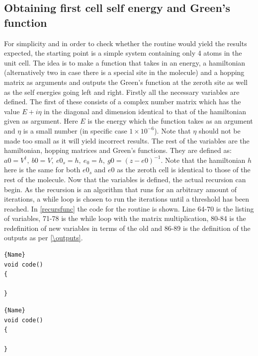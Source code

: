 \subsection{Obtaining first cell self energy and Green's function}\label{recursionroutinesec}
For simplicity and in order to check whether the routine would yield the results expected, the starting point is a simple system containing only 4 atoms in the unit cell. The idea is to make a function that takes in an energy, a hamiltonian (alternatively two in case there is a special site in the molecule) and a hopping matrix as arguments and outputs the Green's function at the zeroth site as well as the self energies going left and right. Firstly all the necessary variables are defined. The first of these consists of a complex number matrix which has the value \(E + i\eta\) in the diagonal and dimension identical to that of the hamiltonian given as argument. Here \(E\) is the energy which the function takes as an argument and \(\eta\) is a small number (in specific case \(1\times10^{-6}\)). Note that \(\eta\) should not be made too small as it will yield incorrect results. The rest of the variables are the hamiltonian, hopping matrices and Green's functions. They are defined as: \(a0 = V^{\dagger}, \ b0 = V, \ e0_{s} = h, \ e_{0} = h, \ g0 = (z-e0)^{-1}\). Note that the hamiltonian \(h\) here is the same for both \(e0_{s}\) and \(e0\) as the zeroth cell is identical to those of the rest of the molecule. Now that the variables is defined, the actual recursion can begin. As the recursion is an algorithm that runs for an arbitrary amount of iterations, a while loop is chosen to run the iterations until a threshold has been reached. In \cref{recursfunc} the code for the routine is shown. Line 64-70 is the listing of variables, 71-78 is the while loop with the matrix multiplication, 80-84 is the redefinition of new variables in terms of the old and 86-89 is the definition of the outputs as per \cref{\outputs}.\\
\noindent\begin{minipage}{.45\textwidth}
\begin{lstlisting}[caption=code 1,frame=tlrb]{Name}
void code()
{

}
\end{lstlisting}
\end{minipage}\hfill
\begin{minipage}{.45\textwidth}
\begin{lstlisting}[caption=code 2,frame=tlrb]{Name}
void code()
{

}
\end{lstlisting}
\end{minipage}\\
